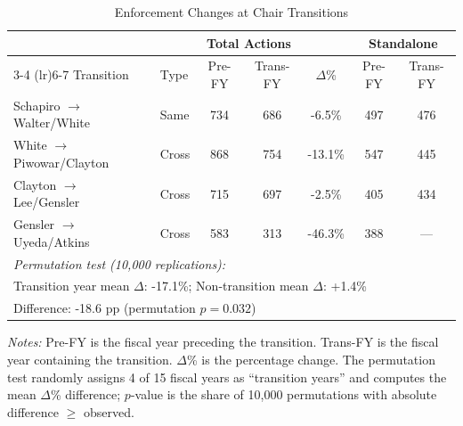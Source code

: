 \begin{table}[t]
\centering
\caption{Enforcement Changes at Chair Transitions}
\label{tab:transition_effects}
\small
\begin{tabular}{llccccc}
\toprule
 & & \multicolumn{2}{c}{Total Actions} & & \multicolumn{2}{c}{Standalone} \\
\cmidrule(lr){3-4} \cmidrule(lr){6-7}
Transition & Type & Pre-FY & Trans-FY & $\Delta$\% & Pre-FY & Trans-FY \\
\midrule
Schapiro $\rightarrow$ Walter/White & Same & 734 & 686 & -6.5\% & 497 & 476 \\
White $\rightarrow$ Piwowar/Clayton & Cross & 868 & 754 & -13.1\% & 547 & 445 \\
Clayton $\rightarrow$ Lee/Gensler & Cross & 715 & 697 & -2.5\% & 405 & 434 \\
Gensler $\rightarrow$ Uyeda/Atkins & Cross & 583 & 313 & -46.3\% & 388 & --- \\
\midrule
\multicolumn{7}{l}{\textit{Permutation test (10,000 replications):}} \\
\multicolumn{7}{l}{Transition year mean $\Delta$: -17.1\%; Non-transition mean $\Delta$: +1.4\%} \\
\multicolumn{7}{l}{Difference: -18.6 pp (permutation $p = 0.032$)} \\
\bottomrule
\end{tabular}
\begin{tablenotes}
\item \textit{Notes:} Pre-FY is the fiscal year preceding the transition. Trans-FY is the fiscal year containing the transition. $\Delta$\% is the percentage change. The permutation test randomly assigns 4 of 15 fiscal years as ``transition years'' and computes the mean $\Delta$\% difference; $p$-value is the share of 10,000 permutations with absolute difference $\geq$ observed.
\end{tablenotes}
\end{table}

